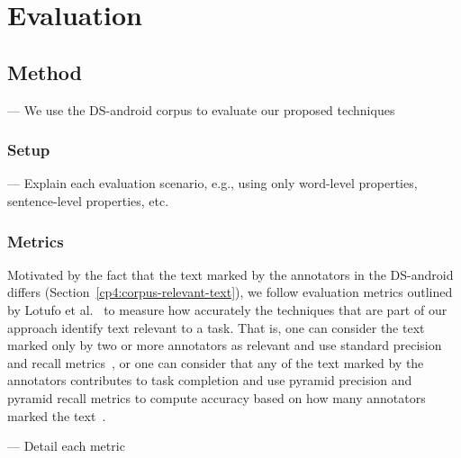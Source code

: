 \section{Evaluation}
\label{cp5:evaluation}




\subsection{Method}



--- We use the \acs{DS-android} corpus to evaluate our proposed techniques  \vspace{3mm}


\subsubsection{Setup}

--- Explain each evaluation scenario, e.g., using only word-level properties, sentence-level properties, etc.



\subsubsection{Metrics}






Motivated by the fact that the text marked by the annotators in the \acs{DS-android} differs
(Section~\ref{cp4:corpus-relevant-text}),
we follow evaluation metrics outlined by Lotufo et al.~\cite{Lotufo2012}
to measure how accurately the techniques that are part of our approach identify text relevant to a task.
That is,
one can consider the text marked only by two or more annotators as relevant
and use standard precision and recall metrics~\cite{Manning2009IR}, or one can consider that
any of the text marked by the annotators 
contributes to task completion and use pyramid 
precision and pyramid recall metrics
to compute accuracy based on how many annotators marked the text~\cite{Nenkova2004, Lotufo2012}. 


--- Detail each metric





    
